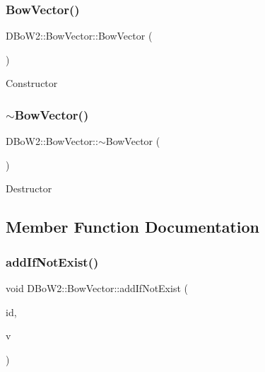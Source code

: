 \subsubsection{\texorpdfstring{Bow\+Vector()}{BowVector()}}
{\footnotesize\ttfamily D\+Bo\+W2\+::\+Bow\+Vector\+::\+Bow\+Vector (\begin{DoxyParamCaption}\item[{void}]{ }\end{DoxyParamCaption})}

Constructor \mbox{\label{classDBoW2_1_1BowVector_a7210cac6ce006c7232f4d097faa338d0}} 
\subsubsection{\texorpdfstring{$\sim$\+Bow\+Vector()}{~BowVector()}}
{\footnotesize\ttfamily D\+Bo\+W2\+::\+Bow\+Vector\+::$\sim$\+Bow\+Vector (\begin{DoxyParamCaption}\item[{void}]{ }\end{DoxyParamCaption})}

Destructor 

\subsection{Member Function Documentation}
\mbox{\label{classDBoW2_1_1BowVector_a5ddf10e444d10425e5bd3568dc7ffe5e}} 
\subsubsection{\texorpdfstring{add\+If\+Not\+Exist()}{addIfNotExist()}}
{\footnotesize\ttfamily void D\+Bo\+W2\+::\+Bow\+Vector\+::add\+If\+Not\+Exist (\begin{DoxyParamCaption}\item[{\hyperlink{namespaceDBoW2_ab1a0d3283b2d4690a383372ed20bfeb5}{Word\+Id}}]{id,  }\item[{\hyperlink{namespaceDBoW2_a55fcd7333e591a38e96b91f41bc182f6}{Word\+Value}}]{v }\end{DoxyParamCaption})}


